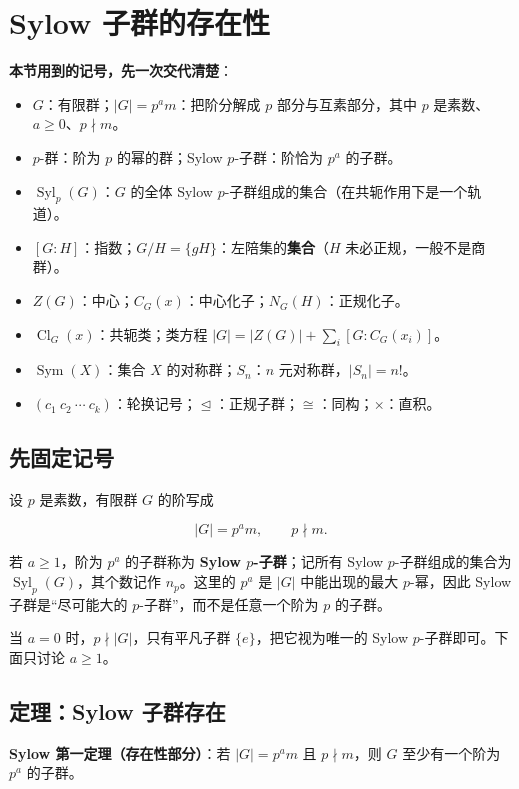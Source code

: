\section{Sylow 子群的存在性}


\textbf{本节用到的记号，先一次交代清楚}：

\begin{itemize}
\item $G$：有限群；$|G|=p^am$：把阶分解成 $p$ 部分与互素部分，其中 $p$ 是素数、$a\ge0$、$p\nmid m$。
\item $p$-群：阶为 $p$ 的幂的群；Sylow $p$-子群：阶恰为 $p^a$ 的子群。
\item $\operatorname{Syl}_p(G)$：$G$ 的全体 Sylow $p$-子群组成的集合（在共轭作用下是一个轨道）。
\item $[G:H]$：指数；$G/H=\{gH\}$：左陪集的\textbf{集合}（$H$ 未必正规，一般不是商群）。
\item $Z(G)$：中心；$C_G(x)$：中心化子；$N_G(H)$：正规化子。
\item $\operatorname{Cl}_G(x)$：共轭类；类方程 $|G|=|Z(G)|+\sum_i[G:C_G(x_i)]$。
\item $\operatorname{Sym}(X)$：集合 $X$ 的对称群；$S_n$：$n$ 元对称群，$|S_n|=n!$。
\item $(c_1\ c_2\ \cdots\ c_k)$：轮换记号；$\trianglelefteq$：正规子群；$\cong$：同构；$\times$：直积。
\end{itemize}


\subsection{先固定记号}


设 $p$ 是素数，有限群 $G$ 的阶写成

\[
|G|=p^a m,\qquad p\nmid m.
\]

若 $a\ge 1$，阶为 $p^a$ 的子群称为 \textbf{Sylow $p$-子群}；记所有 Sylow $p$-子群组成的集合为
$\operatorname{Syl}_p(G)$，其个数记作 $n_p$。这里的 $p^a$ 是 $|G|$ 中能出现的最大 $p$-幂，因此 Sylow 子群是“尽可能大的 $p$-子群”，而不是任意一个阶为 $p$ 的子群。

当 $a=0$ 时，$p\nmid |G|$，只有平凡子群 $\{e\}$，把它视为唯一的 Sylow $p$-子群即可。下面只讨论 $a\ge1$。

\subsection{定理：Sylow 子群存在}


\textbf{Sylow 第一定理（存在性部分）}：若 $|G|=p^a m$ 且 $p\nmid m$，则 $G$ 至少有一个阶为 $p^a$ 的子群。

